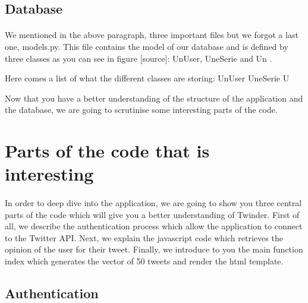 \subsection{Database}

\paragraph{}
We mentioned in the above paragraph, three important files but we forgot a last one, models.py.
This file contains the model of our database and is defined by three classes as you can see in figure [source]: UnUser, UneSerie and Un .

Here comes a list of what the different classes are storing:
	UnUser
	UneSerie
	U

Now that you have a better understanding of the structure of the application and the database, we are going to scrutinise some interesting parts of the code.

\section{Parts of the code that is interesting}

\paragraph{}
In order to deep dive into the application, we are going to show you three central parts of the code which will give you a better understanding of Twinder. First of all, we describe the authentication process which allow the application to connect to the Twitter API. Next, we explain the javascript code which retrieves the opinion of the user for their tweet. Finally, we introduce to you the main function index which generates the vector of 50 tweets and render the html template.

\subsection{Authentication}

